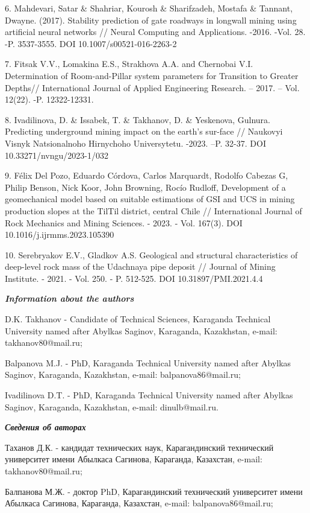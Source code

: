 6. Mahdevari, Satar \& Shahriar, Kourosh \& Sharifzadeh, Mostafa \&
Tannant, Dwayne. (2017). Stability prediction of gate roadways in
longwall mining using artificial neural networks // Neural Computing and
Applications. -2016. -Vol. 28. -P. 3537-3555. DOI
10.1007/s00521-016-2263-2

7. Fitsak V.V., Lomakina E.S., Strakhova A.A. and Chernobai V.I.
Determination of Room-and-Pillar system parameters for Transition to
Greater Depths// International Journal of Applied Engineering Research.
-- 2017. -- Vol. 12(22). -P. 12322-12331.

8. Ivadilinova, D. \& Issabek, T. \& Takhanov, D. \& Yeskenova, Gulnura.
Predicting underground mining impact on the earth's sur-face // Naukovyi
Visnyk Natsionalnoho Hirnychoho Universytetu. -2023. --P. 32-37. DOI
10.33271/nvngu/2023-1/032

9. Félix Del Pozo, Eduardo Córdova, Carlos Marquardt, Rodolfo Cabezas G,
Philip Benson, Nick Koor, John Browning, Rocío Rudloff, Development of a
geomechanical model based on suitable estimations of GSI and UCS in
mining production slopes at the TilTil district, central Chile //
International Journal of Rock Mechanics and Mining Sciences. - 2023. -
Vol. 167(3). DOI 10.1016/j.ijrmms.2023.105390

10. Serebryakov E.V., Gladkov A.S. Geological and structural
characteristics of deep-level rock mass of the Udachnaya pipe deposit //
Journal of Mining Institute. - 2021. - Vol. 250. - P. 512-525. DOI
10.31897/PMI.2021.4.4

\emph{{\bfseries Information about the authors}}

D.K. Takhanov - Candidate of Technical Sciences, Karaganda Technical
University named after Abylkas Saginov, Karaganda, Kazakhstan, e-mail:
takhanov80@mail.ru;

Balpanova M.J. - PhD, Karaganda Technical University named after Abylkas
Saginov, Karaganda, Kazakhstan, e-mail: balpanova86@mail.ru;

Ivadilinova D.T. - PhD, Karaganda Technical University named after
Abylkas Saginov, Karaganda, Kazakhstan, e-mail: dinulb@mail.ru.

\emph{{\bfseries Сведения об авторах}}

Таханов Д.К. - кандидат технических наук, Карагандинский технический
университет имени Абылкаса Сагинова, Караганда, Казахстан, e-mail:
takhanov80@mail.ru;

Балпанова М.Ж. - доктор PhD, Карагандинский технический университет
имени Абылкаса Сагинова, Караганда, Казахстан, e-mail:
balpanova86@mail.ru;

